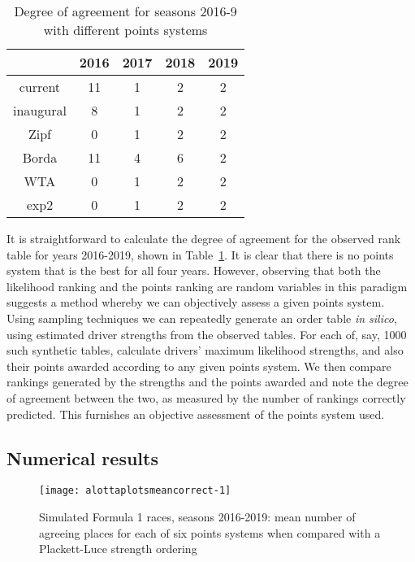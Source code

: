 \documentclass[a4,12pt]{article}
\begin{document}
\begin{table}
\centering
\begin{tabular}{ |c|c|c|c|c|}
 \hline
         &    2016 & 2017 & 2018 & 2019\\ \hline
current  &    11   & 1    & 2    & 2   \\
inaugural&     8   & 1    & 2    & 2   \\
Zipf     &     0   & 1    & 2    & 2   \\
Borda    &    11   & 4    & 6    & 2   \\
WTA      &     0   & 1    & 2    & 2   \\
exp2     &     0   & 1    & 2    & 2   \\
 \hline
\end{tabular}
\caption{\doublespacing Degree of agreement for seasons 2016-9 with
  different \label{doapoints} points systems}
\end{table}


It is straightforward to calculate the degree of agreement for the
observed rank table for years 2016-2019, shown in
Table~\ref{doapoints}.  It is clear that there is no points system
that is the best for all four years.  However, observing that both the
likelihood ranking and the points ranking are random variables in this
paradigm suggests a method whereby we can objectively assess a given
points system.  Using sampling techniques we can repeatedly generate
an order table \emph{in silico}, using estimated driver strengths from
the observed tables.  For each of, say, 1000 such synthetic tables,
calculate drivers' maximum likelihood \citeauthor{plackett1975}
strengths, and also their points awarded according to any given points
system.  We then compare rankings generated by the
\citeauthor{plackett1975} strengths and the points awarded and note
the degree of agreement between the two, as measured by the number of
rankings correctly predicted.  This furnishes an objective assessment
of the points system used.

\subsection{Numerical results}\label{numerical-results}

\begin{figure}
{\centering \texttt{[image: alottaplotsmeancorrect-1]}}
\caption[\doublespacing Simulated Formula 1 races, seasons
  2016-2019]{\doublespacing Simulated Formula 1 races, seasons
  2016-2019: mean number of agreeing places for each of six
  points \label{simulated_mean} systems when compared with a
  Plackett-Luce strength ordering}\label{fig:alottaplotsmeancorrect}
\end{figure}
\end{document}
